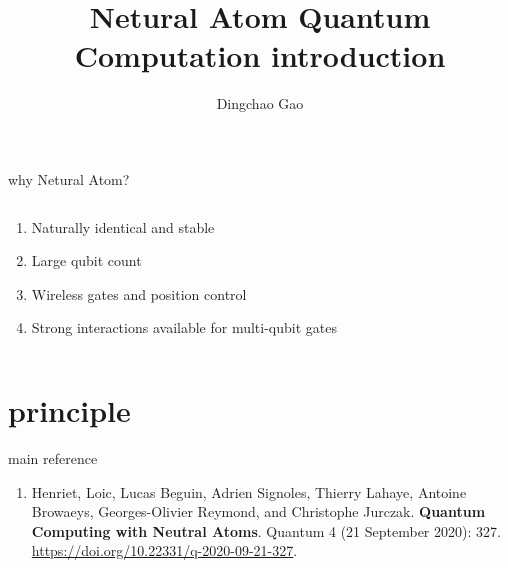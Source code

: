 \documentclass[18 pt]{beamer}
\title{Netural Atom Quantum Computation introduction}
\author[Gcc]{Dingchao Gao}
\institute[ISCAS]{Institute of Software Chinese Academy of Sciences}
\begin{document}
\begin{frame}[plain]
  \titlepage
\end{frame}
\begin{frame}{why Netural Atom?}
  \begin{columns}
    \begin{column}{.8\textwidth}
      \begin{enumerate}
        \item Naturally identical and stable
        \item Large qubit count
        \item Wireless gates and position control
        \item Strong interactions available for multi-qubit gates
      \end{enumerate}
    \end{column}
    \begin{column}{.2\textwidth}
    \end{column}
  \end{columns}
\end{frame}

\section{principle}
\begin{frame}{main reference}
  \begin{enumerate}
    \item Henriet, Loic, Lucas Beguin, Adrien Signoles, Thierry Lahaye, Antoine Browaeys, Georges-Olivier Reymond, and Christophe Jurczak. \textbf{Quantum Computing with Neutral Atoms}. Quantum 4 (21 September 2020): 327. \url{https://doi.org/10.22331/q-2020-09-21-327}.
    
  \end{enumerate}
\end{frame}
\end{document}

